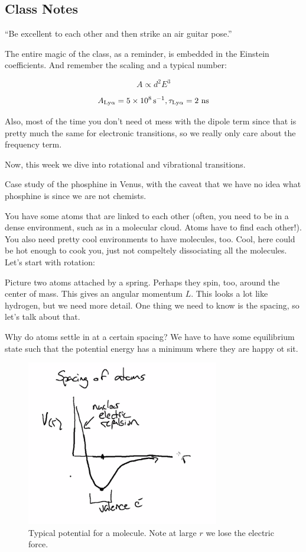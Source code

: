 \documentclass{article}
\newcommand{\unit}[1]{{\,\rm #1}}
\newcommand{\be}{\begin{equation}}
\newcommand{\ee}{\end{equation}}
\newcommand{\s}{\unit{s}}
\begin{document}
\subsection{Class Notes}


``Be excellent to each other and then strike an air guitar pose.''

The entire magic of the class, as a reminder, is embedded in the Einstein coefficients. And remember the scaling and a typical number:

\be
A \propto d^2 E^3 
\ee

\be
A_{\text{Ly}\alpha} = 5 \times 10^{8} \s^{-1}, \tau_{\text{Ly}\alpha} = 2 \text{ ns}
\ee

Also, most of the time you don't need ot mess with the dipole term since that is pretty much the same for electronic transitions, so we really only care about the frequency term. 

Now, this week we dive into rotational and vibrational transitions. 

Case study of the phosphine in Venus, with the caveat that we have no idea what phosphine is since we are not chemists.

You have some atoms that are linked to each other (often, you need to be in a dense environment, such as in a molecular cloud. Atoms have to find each other!). You also need pretty cool environments to have molecules, too. Cool, here could be hot enough to cook you, just not compeltely dissociating all the molecules. Let's start with rotation:

Picture two atoms attached by a spring. Perhaps they spin, too, around the center of mass. This gives an angular momentum $L$. This looks a lot like hydrogen, but we need more detail. One thing we need to know is the spacing, so let's talk about that.

Why do atoms settle in at a certain spacing? We have to have some equilibrium state such that the potential energy has a minimum where they are happy ot sit. 

\begin{figure}
    \centering
    \includegraphics[width=0.75\textwidth]{figures/Screen Shot 2020-09-29 at 11.28.49 AM.png}
    \caption{Typical potential for a molecule. Note at large $r$ we lose the electric force.}
    \label{fig:pot}
\end{figure}
\end{document}
